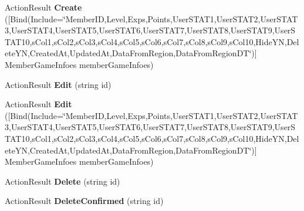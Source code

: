 \begin{DoxyCompactItemize}
\item 
Action\+Result {\bfseries Create} (\mbox{[}Bind(Include=\char`\"{}Member\+ID,Level,Exps,Points,User\+S\+T\+A\+T1,User\+S\+T\+A\+T2,User\+S\+T\+A\+T3,User\+S\+T\+A\+T4,User\+S\+T\+A\+T5,User\+S\+T\+A\+T6,User\+S\+T\+A\+T7,User\+S\+T\+A\+T8,User\+S\+T\+A\+T9,User\+S\+T\+A\+T10,s\+Col1,s\+Col2,s\+Col3,s\+Col4,s\+Col5,s\+Col6,s\+Col7,s\+Col8,s\+Col9,s\+Col10,Hide\+YN,Delete\+YN,Created\+At,Updated\+At,Data\+From\+Region,Data\+From\+Region\+DT\char`\"{})\mbox{]} Member\+Game\+Infoes member\+Game\+Infoes)\hypertarget{class_cloud_bread_admin_web_1_1_controllers_1_1_member_game_infoes_controller_a607bb5650368e5de0accbb61e39fcffc}{}\label{class_cloud_bread_admin_web_1_1_controllers_1_1_member_game_infoes_controller_a607bb5650368e5de0accbb61e39fcffc}

\item 
Action\+Result {\bfseries Edit} (string id)\hypertarget{class_cloud_bread_admin_web_1_1_controllers_1_1_member_game_infoes_controller_a8d91e3965c0cab0f71d9d6fa8d268ab4}{}\label{class_cloud_bread_admin_web_1_1_controllers_1_1_member_game_infoes_controller_a8d91e3965c0cab0f71d9d6fa8d268ab4}

\item 
Action\+Result {\bfseries Edit} (\mbox{[}Bind(Include=\char`\"{}Member\+ID,Level,Exps,Points,User\+S\+T\+A\+T1,User\+S\+T\+A\+T2,User\+S\+T\+A\+T3,User\+S\+T\+A\+T4,User\+S\+T\+A\+T5,User\+S\+T\+A\+T6,User\+S\+T\+A\+T7,User\+S\+T\+A\+T8,User\+S\+T\+A\+T9,User\+S\+T\+A\+T10,s\+Col1,s\+Col2,s\+Col3,s\+Col4,s\+Col5,s\+Col6,s\+Col7,s\+Col8,s\+Col9,s\+Col10,Hide\+YN,Delete\+YN,Created\+At,Updated\+At,Data\+From\+Region,Data\+From\+Region\+DT\char`\"{})\mbox{]} Member\+Game\+Infoes member\+Game\+Infoes)\hypertarget{class_cloud_bread_admin_web_1_1_controllers_1_1_member_game_infoes_controller_a6b3ef646ef34b2a6b8cbf66425c681de}{}\label{class_cloud_bread_admin_web_1_1_controllers_1_1_member_game_infoes_controller_a6b3ef646ef34b2a6b8cbf66425c681de}

\item 
Action\+Result {\bfseries Delete} (string id)\hypertarget{class_cloud_bread_admin_web_1_1_controllers_1_1_member_game_infoes_controller_a500fe8df38d4420b6454bd46b1c5f5eb}{}\label{class_cloud_bread_admin_web_1_1_controllers_1_1_member_game_infoes_controller_a500fe8df38d4420b6454bd46b1c5f5eb}

\item 
Action\+Result {\bfseries Delete\+Confirmed} (string id)\hypertarget{class_cloud_bread_admin_web_1_1_controllers_1_1_member_game_infoes_controller_aea595468488daa717a95d375eb5badfb}{}\label{class_cloud_bread_admin_web_1_1_controllers_1_1_member_game_infoes_controller_aea595468488daa717a95d375eb5badfb}

\end{DoxyCompactItemize}
